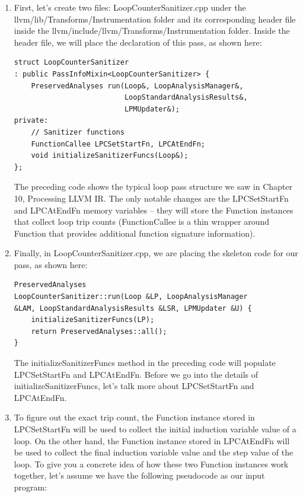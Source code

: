 \begin{enumerate}
\item First, let's create two files: LoopCounterSanitizer.cpp under the llvm/lib/Transforms/Instrumentation folder and its corresponding header file inside the llvm/include/llvm/Transforms/Instrumentation folder. Inside the header file, we will place the declaration of this pass, as shown here:

\begin{lstlisting}[style=styleCXX]
struct LoopCounterSanitizer
: public PassInfoMixin<LoopCounterSanitizer> {
	PreservedAnalyses run(Loop&, LoopAnalysisManager&,
						  LoopStandardAnalysisResults&,
						  LPMUpdater&);
private:
	// Sanitizer functions
	FunctionCallee LPCSetStartFn, LPCAtEndFn;
	void initializeSanitizerFuncs(Loop&);
};
\end{lstlisting}

The preceding code shows the typical loop pass structure we saw in Chapter 10, Processing LLVM IR. The only notable changes are the LPCSetStartFn and LPCAtEndFn memory variables – they will store the Function instances that collect loop trip counts (FunctionCallee is a thin wrapper around Function that provides additional function signature information).

\item Finally, in LoopCounterSanitizer.cpp, we are placing the skeleton code for our pass, as shown here:

\begin{lstlisting}[style=styleCXX]
PreservedAnalyses
LoopCounterSanitizer::run(Loop &LP, LoopAnalysisManager
&LAM, LoopStandardAnalysisResults &LSR, LPMUpdater &U) {
	initializeSanitizerFuncs(LP);
	return PreservedAnalyses::all();
}
\end{lstlisting}

The initializeSanitizerFuncs method in the preceding code will populate LPCSetStartFn and LPCAtEndFn. Before we go into the details of initializeSanitizerFuncs, let's talk more about LPCSetStartFn and LPCAtEndFn.

\item To figure out the exact trip count, the Function instance stored in LPCSetStartFn will be used to collect the initial induction variable value of a loop. On the other hand, the Function instance stored in LPCAtEndFn will be used to collect the final induction variable value and the step value of the loop. To give you a concrete idea of how these two Function instances work together, let's assume we have the following pseudocode as our input program:


\end{enumerate}

